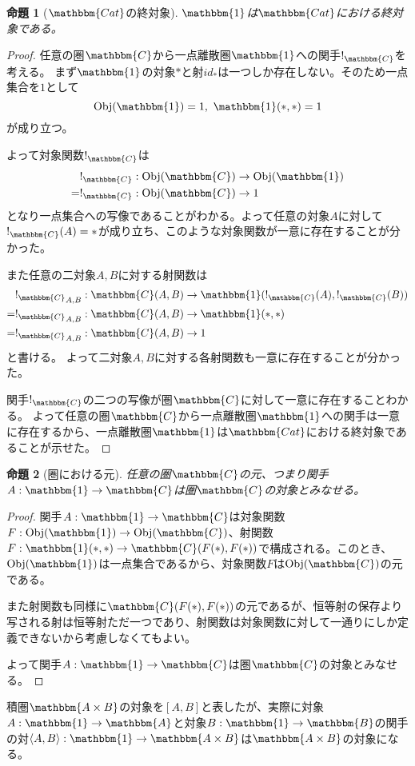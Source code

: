 \documentclass[uplatex,dvipdfmx]{jsarticle}
\newcommand{\cat}[1]{\mathbbm{#1}}
\newcommand{\arrow}{\rightarrow}
\newcommand{\functor}[3]{#1:\cat{#2}\arrow \cat{#3}}
\newcommand{\tuple}[1]{\langle #1\rangle}
\newcommand{\obj}[1]{\mathrm{Obj}(\cat{#1})}
\newcommand{\mor}[3]{#1:#2\arrow #3}
\newcommand{\arset}[3]{\cat{#1}(#2,#3)}
\newcommand{\pcobj}[1]{[#1]}
\newtheorem{proof}{証明}[section]
\newtheorem{prop}{命題}[section]
\numberwithin{proof}{subsection}
\numberwithin{prop}{subsection}
\numberwithin{define}{subsection}
\begin{document}
	\begin{prop}[$\cat{Cat}$の終対象]
		$\cat{1}$は$\cat{Cat}$における終対象である。
	\end{prop}
	\begin{proof}
		任意の圏$\cat{C}$から一点離散圏$\cat{1}$への関手$!_{\cat{C}}$を考える。
		まず$\cat{1}$の対象$*$と射$id_*$は一つしか存在しない。そのため一点集合を$1$として
		\[\obj{1}=1,\ \arset{1}{*}{*}=1\]が成り立つ。

		よって対象関数$!_{\cat{C}}$は
		\begin{align*}
			&\mor{!_{\cat{C}}}{\obj{C}}{\obj{1}}\\
			=&\mor{!_{\cat{C}}}{\obj{C}}{1}
		\end{align*}
		となり一点集合への写像であることがわかる。よって任意の対象$A$に対して$!_{\cat{C}}(A)=*$が成り立ち、このような対象関数が一意に存在することが分かった。

		また任意の二対象$A,B$に対する射関数は
		\begin{align*}
			&\mor{{!_{\cat{C}}}_{A,B}}{\arset{C}{A}{B}}{\arset{1}{!_{\cat{C}}(A)}{!_{\cat{C}}(B)}}\\
			=&\mor{{!_{\cat{C}}}_{A,B}}{\arset{C}{A}{B}}{\arset{1}{*}{*}}\\
			=&\mor{{!_{\cat{C}}}_{A,B}}{\arset{C}{A}{B}}{1}\\
		\end{align*}と書ける。
		よって二対象$A,B$に対する各射関数も一意に存在することが分かった。

		関手$!_{\cat{C}}$の二つの写像が圏$\cat{C}$に対して一意に存在することわかる。
		よって任意の圏$\cat{C}$から一点離散圏$\cat{1}$への関手は一意に存在するから、一点離散圏$\cat{1}$は$\cat{Cat}$における終対象であることが示せた。
	\end{proof}
	\begin{prop}[圏における元]
		任意の圏$\cat{C}$の元、つまり関手$\functor{A}{1}{C}$は圏$\cat{C}$の対象とみなせる。
	\end{prop}
	\begin{proof}
		関手$\functor{A}{1}{C}$は対象関数$\mor{F}{\obj{1}}{\obj{C}}$、射関数$\mor{F}{\arset{1}{*}{*}}{\arset{C}{F(*)}{F(*)}}$で構成される。このとき、$\obj{1}$は一点集合であるから、対象関数$F$は$\obj{C}$の元である。

		また射関数も同様に$\arset{C}{F(*)}{F(*)}$の元であるが、恒等射の保存より写される射は恒等射ただ一つであり、射関数は対象関数に対して一通りにしか定義できないから考慮しなくてもよい。

		よって関手$\functor{A}{1}{C}$は圏$\cat{C}$の対象とみなせる。
	\end{proof}
	積圏$\cat{A\times B}$の対象を$\pcobj{A,B}$と表したが、実際に対象$\functor{A}{1}{A}$と対象$\functor{B}{1}{B}$の関手の対$\functor{\tuple{A,B}}{1}{A\times B}$は$\cat{A\times B}$の対象になる。
\end{document}
